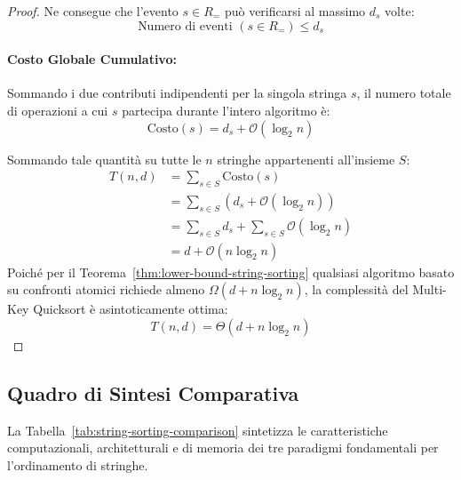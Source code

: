 \begin{proof}
Ne consegue che l'evento $s \in R_=$ pu\`o verificarsi al massimo $d_s$ volte:
\begin{equation}
  \text{Numero di eventi } (s \in R_=) \le d_s
\end{equation}

\paragraph{Costo Globale Cumulativo:}
Sommando i due contributi indipendenti per la singola stringa $s$, il numero totale di operazioni a cui $s$ partecipa durante l'intero algoritmo \`e:
\begin{equation}
  \text{Costo}(s) = d_s + \mathcal{O}(\log_2 n)
\end{equation}

Sommando tale quantit\`a su tutte le $n$ stringhe appartenenti all'insieme $S$:
\begin{align}
  T(n, d) &= \sum_{s \in S} \text{Costo}(s) \nonumber \\
          &= \sum_{s \in S} \left( d_s + \mathcal{O}(\log_2 n) \right) \nonumber \\
          &= \sum_{s \in S} d_s + \sum_{s \in S} \mathcal{O}(\log_2 n) \nonumber \\
          &= d + \mathcal{O}(n \log_2 n)
\end{align}
Poich\'e per il Teorema~\ref{thm:lower-bound-string-sorting} qualsiasi algoritmo basato su confronti atomici richiede almeno $\Omega(d + n \log_2 n)$, la complessit\`a del Multi-Key Quicksort \`e asintoticamente ottima:
\begin{equation}
  T(n, d) = \Theta(d + n \log_2 n)
\end{equation}
\end{proof}

\FloatBarrier
\subsection{Quadro di Sintesi Comparativa}
\label{subsec:sintesi-comparativa-string-sorting}

La Tabella~\ref{tab:string-sorting-comparison} sintetizza le caratteristiche computazionali, architetturali e di memoria dei tre paradigmi fondamentali per l'ordinamento di stringhe.

